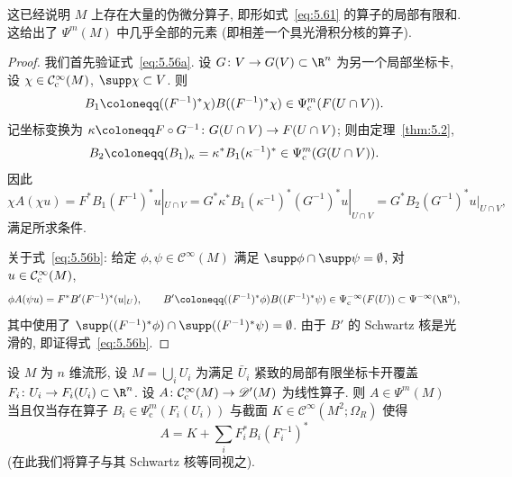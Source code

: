 这已经说明 $M$ 上存在大量的伪微分算子, 即形如式~\eqref{eq:5.61} 的算子的局部有限和. 这给出了 $\Psi^m(M)$ 中几乎全部的元素 (即相差一个具光滑积分核的算子).

\begin{proof}
我们首先验证式~\eqref{eq:5.56a}. 设 $G \colon V \to G(V) \subset \R^n$ 为另一个局部坐标卡, 设 $\chi \in \mathcal{C}_{\mathrm{c}}^\infty(M)$, $\supp\chi \subset V$. 则
\begin{equation}\label{eq:5.62}
    B_1 \defeq ((F^{-1})^* \chi) B ((F^{-1})^* \chi) \in \Psi_{\mathrm{c}}^m(F(U \cap V)).
\end{equation}
记坐标变换为 $\kappa \defeq F \circ G^{-1} \colon G(U \cap V) \to F(U \cap V)$; 则由定理~\ref{thm:5.2},
\begin{equation}\label{eq:5.63}
    B_2 \defeq (B_1)_\kappa = \kappa^* B_1 (\kappa^{-1})^* \in \Psi_{\mathrm{c}}^m(G(U \cap V)).
\end{equation}
因此
\begin{equation}\label{eq:5.64}
    \chi A(\chi u) = F^* B_1 (F^{-1})^* u|_{U \cap V} = G^* \kappa^* B_1 (\kappa^{-1})^* (G^{-1})^* u|_{U \cap V} = G^* B_2 (G^{-1})^* u|_{U \cap V},
\end{equation}
满足所求条件.

关于式~\eqref{eq:5.56b}: 给定 $\phi, \psi \in \mathcal{C}^\infty(M)$ 满足 $\supp\phi \cap \supp\psi = \emptyset$, 对 $u \in \mathcal{C}_{\mathrm{c}}^\infty(M)$,
\begin{equation}\label{eq:5.65}
    \phi A(\psi u) = F^* B' (F^{-1})^* (u|_U), \qquad B' \defeq ((F^{-1})^* \phi) B ((F^{-1})^* \psi) \in \Psi_{\mathrm{c}}^{-\infty}(F(U)) \subset \Psi^{-\infty}(\R^n),
\end{equation}
其中使用了 $\supp((F^{-1})^* \phi) \cap \supp((F^{-1})^* \psi) = \emptyset$. 由于 $B'$ 的 Schwartz 核是光滑的, 即证得式~\eqref{eq:5.56b}.
\end{proof}

\begin{theorem}[通过坐标图册刻画伪微分算子]\label{thm:5.29}
设 $M$ 为 $n$ 维流形, 设 $M = \bigcup_i U_i$ 为满足 $\bar{U}_i$ 紧致的局部有限坐标卡开覆盖 $F_i \colon U_i \to F_i(U_i) \subset \R^n$. 设 $A \colon \mathcal{C}_{\mathrm{c}}^\infty(M) \to \mathscr{D}'(M)$ 为线性算子. 则 $A \in \Psi^m(M)$ 当且仅当存在算子 $B_i \in \Psi_{\mathrm{c}}^m(F_i(U_i))$ 与截面 $K \in \mathcal{C}^\infty(M^2; \Omega_R)$ 使得
\begin{equation}\label{eq:5.66}
    A = K + \sum_i F_i^* B_i (F_i^{-1})^*
\end{equation}
(在此我们将算子与其 Schwartz 核等同视之).
\end{theorem}

